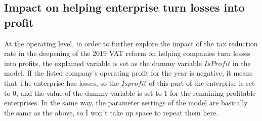 \documentclass[3p,times]{elsarticle}
\begin{document}
\subsection{Impact on helping enterprise turn losses into profit}
At the operating level, in order to further explore the impact of the tax reduction rate in the deepening of the 2019 VAT reform on helping companies turn losses into profits, the explained variable is set as the dummy variable $IsProfit$ in the model. If the listed company’s operating profit for the year is negative, it means that The enterprise has losses, so the $Isprofit$ of this part of the enterprise is set to $0$, and the value of the dummy variable is set to 1 for the remaining profitable enterprises. In the same way, the parameter settings of the model are basically the same as the above, so I won't take up space to repeat them here.
\end{document}
